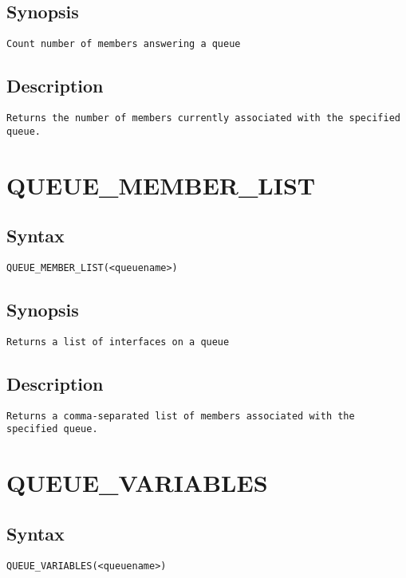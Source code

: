 \subsection{Synopsis}
\begin{verbatim}
Count number of members answering a queue
\end{verbatim}
\subsection{Description}
\begin{verbatim}
Returns the number of members currently associated with the specified queue.

\end{verbatim}


\section{QUEUE\_MEMBER\_LIST}
\subsection{Syntax}
\begin{verbatim}
QUEUE_MEMBER_LIST(<queuename>)
\end{verbatim}
\subsection{Synopsis}
\begin{verbatim}
Returns a list of interfaces on a queue
\end{verbatim}
\subsection{Description}
\begin{verbatim}
Returns a comma-separated list of members associated with the specified queue.

\end{verbatim}


\section{QUEUE\_VARIABLES}
\subsection{Syntax}
\begin{verbatim}
QUEUE_VARIABLES(<queuename>)
\end{verbatim}
